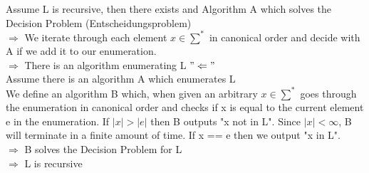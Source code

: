 \documentclass[8pt]{extreport}
\begin{document}
\begin{enumerate}
Assume L is recursive, then there exists and Algorithm A which solves the Decision Problem (Entscheidungsproblem)\\
$\Rightarrow$ We iterate through each element $x \in \sum^*$ in canonical order and decide with A if we add it to our enumeration.\\
$\Rightarrow$ There is an algorithm enumerating L
\newline
$"\Leftarrow"$\\
Assume there is an algorithm A which enumerates L\\
We define an algorithm B which, when given an arbitrary $x \in \sum^*$ goes through the enumeration in canonical order and checks if x is equal to the current element e in the enumeration. If $|x| > |e|$ then B outputs "x not in L". Since $|x| < \infty$, B will terminate in a finite amount of time. If x == e then we output "x in L".\\
$\Rightarrow$ B solves the Decision Problem for L\\
$\Rightarrow$ L is recursive
\end{enumerate}
\end{document}
